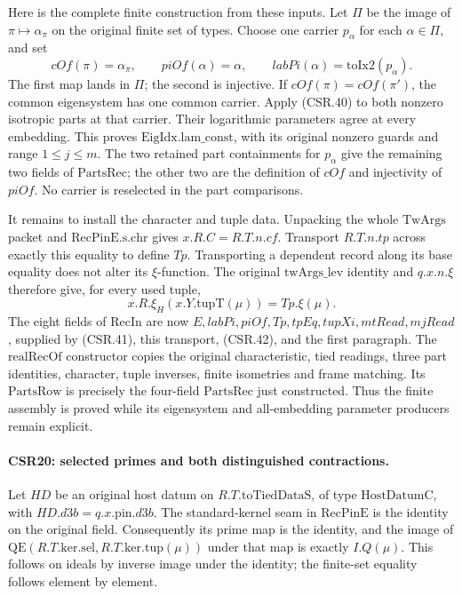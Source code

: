 Here is the complete finite construction from these
inputs. Let \(\Pi\) be the image of \(\pi\mapsto\alpha_\pi\)
on the original finite set of types. Choose one carrier
\(p_\alpha\) for each \(\alpha\in\Pi\), and set
\[
 cOf(\pi)=\alpha_\pi,\qquad
 piOf(\alpha)=\alpha,\qquad
 labPi(\alpha)=\mathrm{toIx2}(p_\alpha).
 \tag{CSR.41}
\]
The first map lands in \(\Pi\); the second is injective.
If \(cOf(\pi)=cOf(\pi')\), the common eigensystem has
one common carrier. Apply (CSR.40) to both nonzero
isotropic parts at that carrier. Their logarithmic
parameters agree at every embedding. This proves
\(\mathrm{EigIdx.lam\_const}\), with its original
nonzero guards and range \(1\leq j\leq m\).
The two retained part containments for \(p_\alpha\)
give the remaining two fields of \(\mathrm{PartsRec}\);
the other two are the definition of \(cOf\) and
injectivity of \(piOf\). No carrier is reselected in
the part comparisons.

It remains to install the character and tuple data.
Unpacking the whole \(\mathrm{TwArgs}\) packet and
\(\mathrm{RecPinE.s.chr}\) gives
\(x.R.C=R.T.n.cf\). Transport \(R.T.n.tp\) across exactly
this equality to define \(Tp\). Transporting a dependent
record along its base equality does not alter its
\(\xi\)-function. The original \(\mathrm{twArgs\_lev}\)
identity and \(q.x.n.\xi\) therefore give, for every
used tuple,
\[
 x.R.\xi_H(x.Y.\mathrm{tupT}(\mu))=Tp.\xi(\mu).
 \tag{CSR.42}
\]
The eight fields of \(\mathrm{RecIn}\) are now
\(E,labPi,piOf,Tp,tpEq,tupXi,mtRead,mjRead\), supplied
by (CSR.41), this transport, (CSR.42), and the first
paragraph. The \(\mathrm{realRecOf}\) constructor copies
the original characteristic, tied readings, three part
identities, character, tuple inverses, finite isometries
and frame matching. Its \(\mathrm{PartsRow}\) is precisely
the four-field \(\mathrm{PartsRec}\) just constructed.
Thus the finite assembly is proved while its
eigensystem and all-embedding parameter producers remain
explicit.

\paragraph{CSR20: selected primes and both distinguished contractions.}
\label{claim:CSR20}
Let \(HD\) be an original host datum on
\(R.T.\mathrm{toTiedDataS}\), of type \(\mathrm{HostDatumC}\), with
\(HD.d3b=q.x.\mathrm{pin}.d3b\).
The standard-kernel seam in \(\mathrm{RecPinE}\) is the
identity on the original field. Consequently its prime
map is the identity, and the image of
\(\mathrm{QE}(R.T.\mathrm{ker.sel},R.T.\mathrm{ker.tup}(\mu))\)
under that map is exactly \(I.Q(\mu)\).
This follows on ideals by inverse image under the identity;
the finite-set equality follows element by element.

